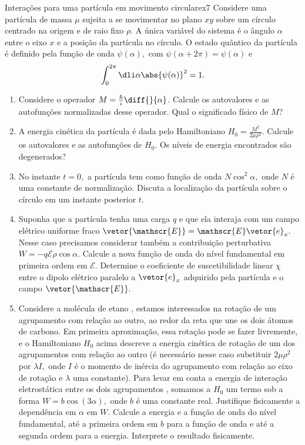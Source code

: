 \begin{exercício}{Interações para uma partícula em movimento circular}{ex7}
    Considere uma partícula de massa \(\mu\) sujeita a se movimentar no plano \(xy\) sobre um círculo centrado na origem e de raio fixo \(\rho\). A única variável do sistema é o ângulo \(\alpha\) entre o eixo \(x\) e a posição da partícula no círculo. O estado quântico da partícula é definido pela função de onda \(\psi(\alpha),\) com \(\psi(\alpha + 2\pi) = \psi(\alpha)\) e
    \begin{equation*}
       \int_0^{2\pi}{\dli\alpha \abs{\psi(\alpha)}^2} = 1.
    \end{equation*}
    \begin{enumerate}[label=(\alph*)]
       \item Considere o operador \(M = \frac{\hbar}{i} \diff{}{\alpha}\). Calcule os autovalores e as autofunções normalizadas desse operador. Qual o significado físico de \(M\)?
       \item A energia cinética da partícula é dada pelo Hamiltoniano \(H_0 = \frac{M^2}{2 \mu \rho^2}.\) Calcule os autovalores e as autofunções de \(H_0.\) Os níveis de energia encontrados são degenerados?
       \item No instante \(t = 0,\) a partícula tem como função de onda \(N \cos^2 \alpha,\) onde \(N\) é uma constante de normalização. Discuta a localização da partícula sobre o círculo em um instante posterior \(t.\)
       \item Suponha que a partícula tenha uma carga \(q\) e que ela interaja com um campo elétrico uniforme fraco \(\vetor{\mathscr{E}} = \mathscr{E}\vetor{e}_x.\) Nesse caso precisamos considerar também a contribuição perturbativa \(W = -q \mathscr{E} \rho \cos\alpha.\) Calcule a nova função de onda do nível fundamental em primeira ordem em \(\mathscr{E}.\) Determine o coeficiente de suscetibilidade linear \(\chi\) entre o dipolo elétrico paralelo a \(\vetor{e}_x\) adquirido pela partícula e o campo \(\vetor{\mathscr{E}}.\)
       \item Considere a molécula de etano , estamos interessados na rotação de um agrupamento  com relação ao outro, ao redor da reta que une os dois átomos de carbono. Em primeira aproximação, essa rotação pode se fazer livremente, e o Hamiltoniano \(H_0\) acima descreve a energia cinética de rotação de um dos agrupamentos  com relação ao outro (é necessário nesse caso substituir \(2 \mu \rho^2\) por \(\lambda I,\) onde \(I\) é o momento de inércia do agrupamento  com relação ao eixo de rotação e \(\lambda\) uma constante). Para levar em conta a energia de interação eletrostática entre os dois agrupamentos , somamos a \(H_0\) um termo sob a forma \(W = b \cos(3\alpha),\) onde \(b\) é uma constante real. Justifique fisicamente a dependência em \(\alpha\) em \(W\). Calcule a energia e a função de onda do nível fundamental, até a primeira ordem em \(b\) para a função de onda e até a segunda ordem para a energia. Interprete o resultado fisicamente.
    \end{enumerate}
\end{exercício}
